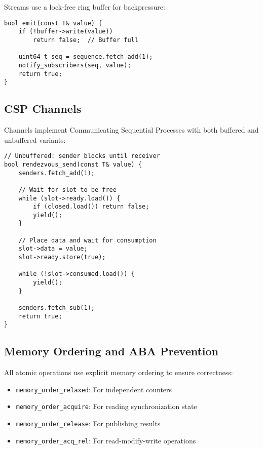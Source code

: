 \documentclass[10pt,conference]{IEEEtran}
\begin{document}
Streams use a lock-free ring buffer for backpressure:

\begin{lstlisting}[caption={Stream Ring Buffer},label={lst:streamring}]
bool emit(const T& value) {
    if (!buffer->write(value))
        return false;  // Buffer full
    
    uint64_t seq = sequence.fetch_add(1);
    notify_subscribers(seq, value);
    return true;
}
\end{lstlisting}

\subsection{CSP Channels}

Channels implement Communicating Sequential Processes with both buffered and unbuffered variants:

\begin{lstlisting}[caption={Channel Rendezvous},label={lst:channel}]
// Unbuffered: sender blocks until receiver
bool rendezvous_send(const T& value) {
    senders.fetch_add(1);
    
    // Wait for slot to be free
    while (slot->ready.load()) {
        if (closed.load()) return false;
        yield();
    }
    
    // Place data and wait for consumption
    slot->data = value;
    slot->ready.store(true);
    
    while (!slot->consumed.load()) {
        yield();
    }
    
    senders.fetch_sub(1);
    return true;
}
\end{lstlisting}

\subsection{Memory Ordering and ABA Prevention}

All atomic operations use explicit memory ordering to ensure correctness:

\begin{itemize}
\item \texttt{memory\_order\_relaxed}: For independent counters
\item \texttt{memory\_order\_acquire}: For reading synchronization state
\item \texttt{memory\_order\_release}: For publishing results
\item \texttt{memory\_order\_acq\_rel}: For read-modify-write operations
\end{itemize}
\end{document}
